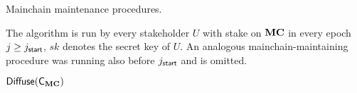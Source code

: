 \begin{algorithm}
  \caption{\label{alg.maintain.MC}Mainchain maintenance procedures.}
  \smallskip
  The algorithm is run by every stakeholder $U$ with stake on $\mathbf{MC}$ in every
  epoch $j\geq j_{\mathsf{start}}$, $sk$ denotes the secret key of $U$. An analogous
  mainchain-maintaining procedure was running also before $j_{\mathsf{start}}$ and is
  omitted.
  \smallskip
  \begin{algorithmic}[1]
          \label{line:SD}
      \EndIf
        \label{line:filter}
        \label{line:leader}
        \Let{\vec\tx_{\valid}}{\verifierMCtx(\vec\tx_{\state}\concat\vec\tx)[|\vec\tx_{\state}|:]}
          \label{line:filtertx}
          \label{line:construct}
        \State $\mathsf{Diffuse}(\mathsf{C_{\mathbf{MC}}})$
      \EndIf
    \EndOn
  \end{algorithmic}
\end{algorithm}
